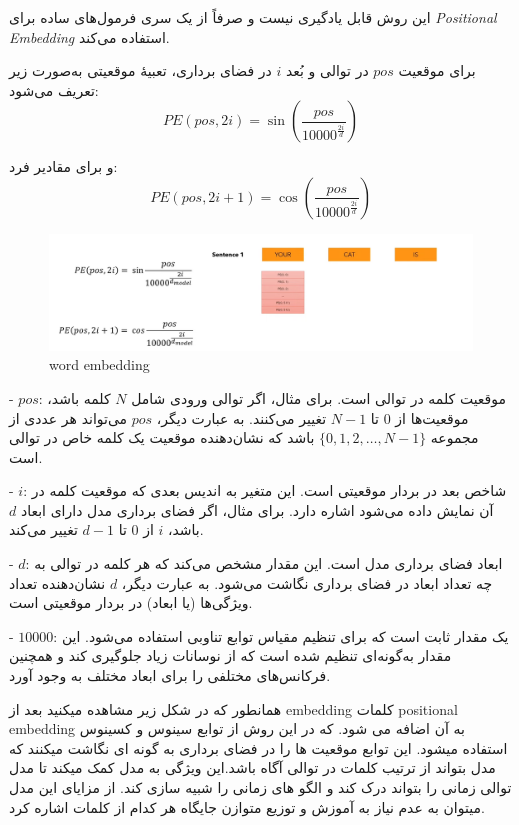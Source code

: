 این روش قابل یادگیری نیست و صرفاً از یک سری فرمول‌های ساده برای \textit{Positional Embedding} استفاده می‌کند.

برای موقعیت \( pos \) در توالی و بُعد \( i \) در فضای برداری، تعبیهٔ موقعیتی به‌صورت زیر تعریف می‌شود:
\[
PE(pos, 2i) = \sin\left( \frac{pos}{10000^{\frac{2i}{d}}} \right)
\]

و برای مقادیر فرد:
\[
PE(pos, 2i+1) = \cos\left( \frac{pos}{10000^{\frac{2i}{d}}} \right)
\]




\begin{figure}[h]
	\centering
	\begin{minipage}[b]{0.7\textwidth}
		\centering
		\includegraphics[width=\textwidth]{transformer_images/positional_embedding_formula .png}
		\caption{word embedding}
		\label{fig:positional embedding}
	\end{minipage}
	\hfill
	
\end{figure}



- \( pos \): موقعیت کلمه در توالی است. برای مثال، اگر توالی ورودی شامل \( N \) کلمه باشد، موقعیت‌ها از \( 0 \) تا \( N-1 \) تغییر می‌کنند. به عبارت دیگر، \( pos \) می‌تواند هر عددی از مجموعه \( \{0, 1, 2, \dots, N-1\} \) باشد که نشان‌دهنده موقعیت یک کلمه خاص در توالی است.

- \( i \): شاخص بعد در بردار موقعیتی است. این متغیر به اندیس بعدی که موقعیت کلمه در آن نمایش داده می‌شود اشاره دارد. برای مثال، اگر فضای برداری مدل دارای ابعاد \( d \) باشد، \( i \) از \( 0 \) تا \( d-1 \) تغییر می‌کند.

- \( d \): ابعاد فضای برداری مدل است. این مقدار مشخص می‌کند که هر کلمه در توالی به چه تعداد ابعاد در فضای برداری نگاشت می‌شود. به عبارت دیگر، \( d \) نشان‌دهنده تعداد ویژگی‌ها (یا ابعاد) در بردار موقعیتی است.

- \( 10000 \): یک مقدار ثابت است که برای تنظیم مقیاس توابع تناوبی استفاده می‌شود. این مقدار به‌گونه‌ای تنظیم شده است که از نوسانات زیاد جلوگیری کند و همچنین فرکانس‌های مختلفی را برای ابعاد مختلف به وجود آورد.

همانطور که در شکل زیر مشاهده میکنید بعد از embedding  کلمات  positional embedding  به آن اضافه می شود.
که در این روش از توابع سینوس و کسینوس استفاده میشود.
این توابع موقعیت ها را در فضای برداری به گونه ای نگاشت میکنند که مدل بتواند از ترتیب کلمات در توالی آگاه باشد.این ویژگی به مدل کمک میکند تا مدل توالی زمانی را بتواند درک کند و الگو های زمانی را شبیه سازی کند.
از مزایای این مدل میتوان به عدم نیاز به آموزش و توزیع متوازن جایگاه هر کدام از کلمات اشاره کرد.


